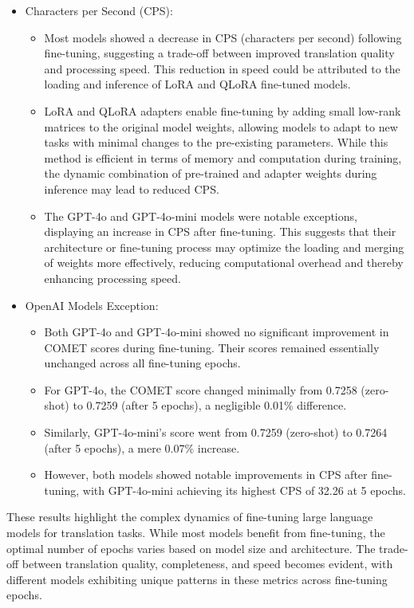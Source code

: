 \documentclass[conference]{IEEEtran}
\begin{document}
\begin{itemize}
\item Characters per Second (CPS):
\begin{itemize}
    \item Most models showed a decrease in CPS (characters per second) following fine-tuning, suggesting a trade-off between improved translation quality and processing speed. This reduction in speed could be attributed to the loading and inference of LoRA and QLoRA fine-tuned models. 
    \item LoRA and QLoRA adapters enable fine-tuning by adding small low-rank matrices to the original model weights, allowing models to adapt to new tasks with minimal changes to the pre-existing parameters. While this method is efficient in terms of memory and computation during training, the dynamic combination of pre-trained and adapter weights during inference may lead to reduced CPS.

    \item The GPT-4o and GPT-4o-mini models were notable exceptions, displaying an increase in CPS after fine-tuning. This suggests that their architecture or fine-tuning process may optimize the loading and merging of weights more effectively, reducing computational overhead and thereby enhancing processing speed.
\end{itemize}

    \item OpenAI Models Exception:
    \begin{itemize}
        \item Both GPT-4o and GPT-4o-mini showed no significant improvement in COMET scores during fine-tuning. Their scores remained essentially unchanged across all fine-tuning epochs.
        \item For GPT-4o, the COMET score changed minimally from 0.7258 (zero-shot) to 0.7259 (after 5 epochs), a negligible 0.01\% difference.
        \item Similarly, GPT-4o-mini's score went from 0.7259 (zero-shot) to 0.7264 (after 5 epochs), a mere 0.07\% increase.
        \item However, both models showed notable improvements in CPS after fine-tuning, with GPT-4o-mini achieving its highest CPS of 32.26 at 5 epochs.
    \end{itemize}
\end{itemize}

These results highlight the complex dynamics of fine-tuning large language models for translation tasks. While most models benefit from fine-tuning, the optimal number of epochs varies based on model size and architecture. The trade-off between translation quality, completeness, and speed becomes evident, with different models exhibiting unique patterns in these metrics across fine-tuning epochs.
\end{document}
